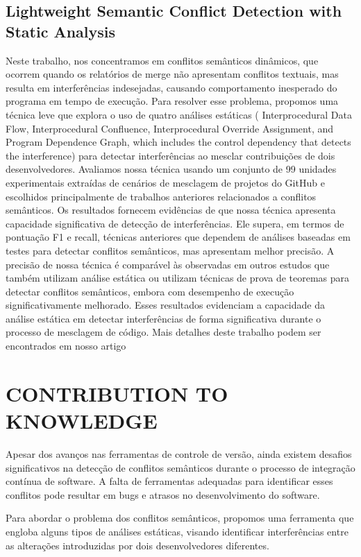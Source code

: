 \documentclass[sigconf,review]{acmart}
\begin{document}
\subsection{Lightweight Semantic Conflict Detection with Static Analysis}
Neste trabalho, nos concentramos em conflitos semânticos dinâmicos, que ocorrem quando os relatórios de merge não apresentam conflitos textuais, mas resulta em interferências indesejadas, causando comportamento inesperado do programa em tempo de execução.
Para resolver esse problema, propomos uma técnica leve que explora o uso de quatro análises estáticas ( Interprocedural Data Flow, Interprocedural
Confluence, Interprocedural Override Assignment, and Program Dependence Graph, which includes the control
dependency that detects the interference) para detectar interferências ao mesclar contribuições de dois desenvolvedores.
Avaliamos nossa técnica usando um conjunto de 99 unidades experimentais extraídas de cenários de mesclagem de projetos do GitHub e escolhidos principalmente de trabalhos anteriores relacionados a conflitos semânticos. 
Os resultados fornecem evidências de que nossa técnica apresenta capacidade significativa de detecção de interferências. Ele supera, em termos de pontuação F1 e recall, técnicas anteriores que dependem de análises baseadas em testes para detectar conflitos semânticos, mas apresentam melhor precisão.
A precisão de nossa técnica é comparável às observadas em outros estudos que também utilizam análise estática ou utilizam técnicas de prova de teoremas para detectar conflitos semânticos, embora com desempenho de execução significativamente melhorado. Esses resultados evidenciam a capacidade da análise estática em detectar interferências de forma significativa durante o processo de mesclagem de código. Mais detalhes deste trabalho podem ser encontrados em nosso artigo \cite{galileu}

\section{CONTRIBUTION TO KNOWLEDGE}

Apesar dos avanços nas ferramentas de controle de versão, ainda existem desafios significativos na detecção de conflitos semânticos durante o processo de integração contínua de software. A falta de ferramentas adequadas para identificar esses conflitos pode resultar em bugs e atrasos no desenvolvimento do software.

Para abordar o problema dos conflitos semânticos, propomos uma ferramenta que engloba alguns tipos de análises estáticas, visando identificar interferências entre as alterações introduzidas por dois desenvolvedores diferentes. 
\end{document}
